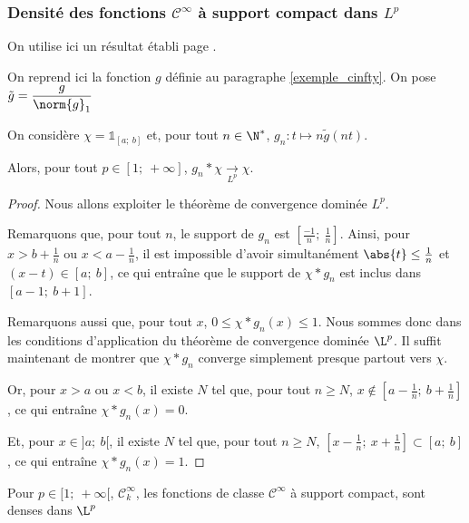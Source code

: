 \subsubsection{Densité des fonctions $\mathcal{C}^{\infty}$ à support compact dans $L^p$}

On utilise ici un résultat établi page \pageref{densite_intervalles}.

\begin{prop}
On reprend ici la fonction $g$ définie au paragraphe \ref{exemple_cinfty}. On pose $\tilde{g} = \dfrac{g}{\norm{g}_1}$

On considère $\chi = \mathbb{1}_{[a;~b]}$ et, pour tout $n \in \N^*$, $g_n: t \mapsto n\tilde{g}(nt)$.

Alors, pour tout $p \in [1;~+\infty]$, $g_n*\chi \underset{L^p}{\longrightarrow} \chi$.
\end{prop}

\begin{proof}
Nous allons exploiter le théorème de convergence dominée $L^p$.

\medskip
Remarquons que, pour tout $n$, le support de $g_n$ est $\left [ \frac{-1}{n};~\frac{1}{n}\right ]$. Ainsi, pour $x > b + \frac{1}{n}$ ou $x < a - \frac{1}{n}$, il est impossible d'avoir simultanément $\abs{t} \leq \frac{1}{n}$ et $(x-t) \in [a;~b]$, ce qui entraîne que le support de $\chi * g_n$ est inclus dans $\left [a-1;~b+1 \right ]$.

\medskip
Remarquons aussi que, pour tout $x$, $0 \leq \chi * g_n (x) \leq 1$. Nous sommes donc dans les conditions d'application du théorème de convergence dominée $\L^p$. Il suffit maintenant de montrer que $\chi * g_n$ converge simplement presque partout vers $\chi$. 


Or, pour $x>a$ ou $x<b$, il existe $N$ tel que, pour tout $n \geq N$, $x \notin \left [ a-\frac{1}{n};~b+\frac{1}{n}  \right ]$, ce qui entraîne $\chi * g_n(x) = 0$.


Et, pour $x \in ]a;~b[$, il existe $N$ tel que, pour tout $n \geq N$, $\left [ x - \frac{1}{n};~x + \frac{1}{n}\right ] \subset [a;~b]$, ce qui entraîne $\chi * g_n(x) = 1$.
\end{proof}

\begin{cor}
Pour $p \in [1;~+\infty[$, $\mathcal{C}^{\infty}_k$, les fonctions de classe $\mathcal{C}^{\infty}$ à support compact, sont denses dans $\L^p$
\end{cor}


